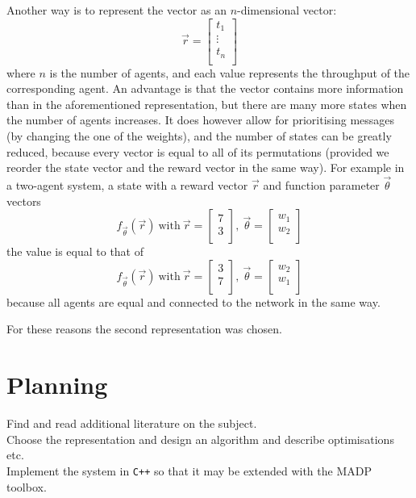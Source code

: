 \documentclass{article}
\begin{document}
\begin{multicols}{2}
		Another way is to represent the vector as an $n$-dimensional vector:
		$$\vec{r} = \begin{bmatrix}
			t_1\\
			\vdots\\
			t_n\\
		\end{bmatrix}$$
		where $n$ is the number of agents, and each value represents the
		throughput of the corresponding agent. An advantage is that the vector
		contains more information than in the aforementioned representation, but
		there are many more states when the number of agents increases. It does
		however allow for prioritising messages (by changing the one of the
		weights), and the number of states can be greatly reduced, because every
		vector is equal to all of its permutations (provided we reorder the state
		vector and the reward vector in the same way).
		For example in a two-agent system, a state with a reward vector $\vec{r}$
		and function parameter $\vec{\theta}$
		vectors
		$$ f_{\vec{\theta}}(\vec{r})~\textrm{with}~\vec{r} = \begin{bmatrix}
			7\\
			3\\
		\end{bmatrix},~
		\vec{\theta} = \begin{bmatrix}
			w_1\\
			w_2\\
		\end{bmatrix}$$
		the value is equal to that of
		$$ f_{\vec{\theta}}(\vec{r})~\textrm{with}~\vec{r} = \begin{bmatrix}
			3\\
			7\\
		\end{bmatrix},~
		\vec{\theta} = \begin{bmatrix}
			w_2\\
			w_1\\
		\end{bmatrix}$$
		because all agents are equal and connected to the network in the same
		way.

		For these reasons the second representation was chosen.
	\end{multicols}


	\section{Planning}
	\label{sec:planning}
	Find and read additional literature on the subject.\\
	Choose the representation and design an algorithm and describe optimisations
	etc.\\
	Implement the system in \texttt{C++} so that it may be extended with the
	MADP toolbox.
	\pagebreak

	
	
\end{document}
